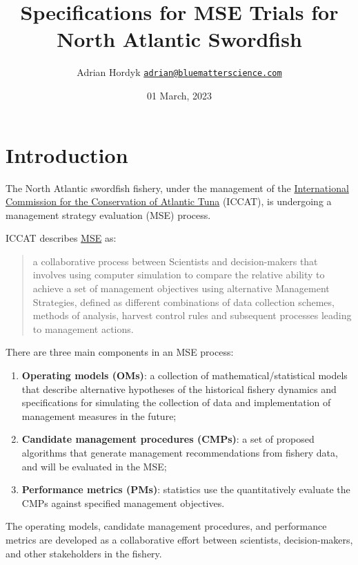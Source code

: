 \documentclass[
]{article}
\title{Specifications for MSE Trials for North Atlantic Swordfish}
\author{Adrian Hordyk \href{mailto:adrian@bluematterscience.com}{\nolinkurl{adrian@bluematterscience.com}}}
\date{01 March, 2023}
\providecommand{\tightlist}{%
  \setlength{\itemsep}{0pt}\setlength{\parskip}{0pt}}
\begin{document}
\maketitle

{
\hypersetup{linkcolor=}
\setcounter{tocdepth}{2}
\tableofcontents
}
\hypertarget{introduction}{%
\section{Introduction}\label{introduction}}

The North Atlantic swordfish fishery, under the management of the \href{https://www.iccat.int/en/index.asp}{International Commission for the Conservation of Atlantic Tuna} (ICCAT), is undergoing a management strategy evaluation (MSE) process.

ICCAT describes \href{https://www.iccat.int/mse/en/index.asp}{MSE} as:

\begin{quote}
a collaborative process between Scientists and decision-makers that involves using computer simulation to compare the relative ability to achieve a set of management objectives using alternative Management Strategies, defined as different combinations of data collection schemes, methods of analysis, harvest control rules and subsequent processes leading to management actions.
\end{quote}

There are three main components in an MSE process:

\begin{enumerate}
\def\labelenumi{\arabic{enumi}.}
\tightlist
\item
  \textbf{Operating models (OMs)}: a collection of mathematical/statistical models that describe alternative hypotheses of the historical fishery dynamics and specifications for simulating the collection of data and implementation of management measures in the future;
\item
  \textbf{Candidate management procedures (CMPs)}: a set of proposed algorithms that generate management recommendations from fishery data, and will be evaluated in the MSE;
\item
  \textbf{Performance metrics (PMs)}: statistics use the quantitatively evaluate the CMPs against specified management objectives.
\end{enumerate}

The operating models, candidate management procedures, and performance metrics are developed as a collaborative effort between scientists, decision-makers, and other stakeholders in the fishery.
\end{document}
